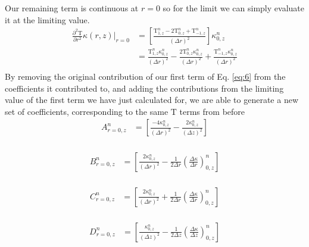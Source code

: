 \documentclass[12pt]{article}
\begin{document}
      Our remaining term is continuous at $r=0$ so for the limit we can simply evaluate it at the limiting value.
      \begin{equation}
        \begin{aligned}
          \frac{\partial^2\mathrm{T}}{\partial r^2}\kappa(r, z)\rvert_{r=0} &= \left [\frac{\mathrm{T}^{n}_{1, z}  - 2 \mathrm{T}^{n}_{0, z} +  \mathrm{T}^{n}_{-1, z}}{(\Delta r)^2} \right ] \kappa^n_{0, z} \\
           &= \frac{\mathrm{T}^n_{1, z}\kappa^n_{0, z}}{(\Delta r)^2} - \frac{2 \mathrm{T}^n_{0, z}\kappa^n_{0,z}}{(\Delta r)^2} + \frac{\mathrm{T}^n_{- 1, z}\kappa^n_{0,z}}{(\Delta r)^2}\\
        \end{aligned}
      \end{equation}
    By removing the original contribution of our first term of Eq. \ref{eq:6} from the coefficients it contributed to, and adding the contributions from the limiting value of the first term we have just calculated for, we are able to generate a new set of coefficients, corresponding to the same $\mathrm{T}$ terms from before
		\begin{equation}
      \begin{aligned}
        A^n_{r=0, z} &= \left [\frac{-4\kappa^n_{0, z}}{(\Delta r)^2} -\frac{2\kappa^n_{0, z}}{(\Delta z)^2}  \right ] \\
      \end{aligned}
		\end{equation}

		\begin{equation}
      \begin{aligned}
        B^n_{r=0, z} &= \left [\frac{2\kappa^n_{0, z}}{(\Delta r)^2} - \frac{1}{2\Delta r}(\frac{\Delta\kappa}{\Delta r})^n_{0, z} \right ] \\
      \end{aligned}
		\end{equation}

		
		\begin{equation}
      \begin{aligned}
        C^n_{r=0, z} &= \left [\frac{2\kappa^n_{0, z}}{(\Delta r)^2} + \frac{1}{2\Delta r}(\frac{\Delta\kappa}{\Delta r})^n_{0, z} \right ] \\
      \end{aligned}
		\end{equation}
		
		\begin{equation}
      \begin{aligned}
        D^n_{r=0, z} &= \left [\frac{\kappa^n_{0, z}}{(\Delta z)^2} - \frac{1}{2\Delta z}(\frac{\Delta\kappa}{\Delta z})^n_{0, z}  \right ] \\
      \end{aligned}
		\end{equation}
		
\end{document}
